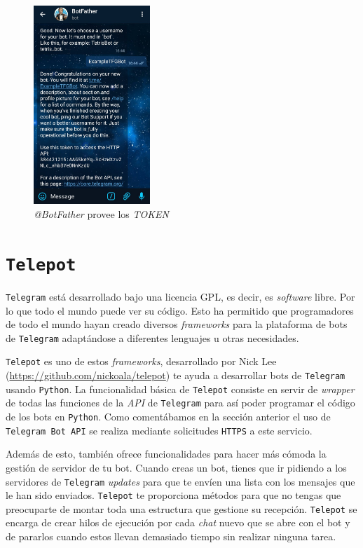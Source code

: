 \documentclass[oneside]{memoir}
\begin{document}
\begin{figure}[h!]
\centering
\includegraphics[height=75mm]{tokenBotFather.jpg}
\caption{\textit{@BotFather} provee los \textit{TOKEN}}
\label{fig:tokenBotFather}
\end{figure}

\section{\texttt{Telepot}}
\texttt{Telegram} está desarrollado bajo una licencia GPL, es decir, es \textit{software} libre. Por lo que todo el mundo puede ver su código. Esto ha permitido que programadores de todo el mundo hayan creado diversos \textit{frameworks} para la plataforma de bots de \texttt{Telegram} adaptándose a diferentes lenguajes u otras necesidades. 

\texttt{Telepot} es uno de estos \textit{frameworks}, desarrollado por Nick Lee (\url{https://github.com/nickoala/telepot}) te ayuda a desarrollar bots de \texttt{Telegram} usando \texttt{Python}. La funcionalidad básica de \texttt{Telepot} consiste en servir de \textit{wrapper} de todas las funciones de la \textit{API} de \texttt{Telegram} para así poder programar el código de los bots en \texttt{Python}. Como comentábamos en la sección anterior el uso de \texttt{Telegram Bot API} se realiza mediante solicitudes \texttt{HTTPS} a este servicio.

Además de esto, también ofrece funcionalidades para hacer más cómoda la gestión de servidor de tu bot. Cuando creas un bot, tienes que ir pidiendo a los servidores de \texttt{Telegram} \textit{updates} para que te envíen una lista con los mensajes que le han sido enviados. \texttt{Telepot} te proporciona métodos para que no tengas que preocuparte de montar toda una estructura que gestione su recepción. \texttt{Telepot} se encarga de crear hilos de ejecución por cada \textit{chat} nuevo que se abre con el bot y de pararlos cuando estos llevan demasiado tiempo sin realizar ninguna tarea.
\end{document}
